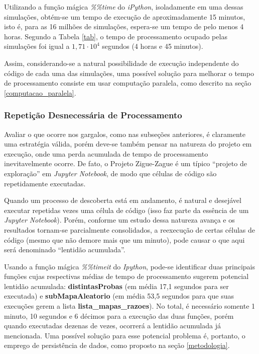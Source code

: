 \documentclass[12pt]{article}
\newcommand{\aspas}[1]{``#1''} %
\begin{document}
Utilizando a função mágica \textit{\%\%time} do \textit{iPython}, isoladamente em uma dessas simulações, obtém-se um tempo de execução de aproximadamente 15 minutos, isto é, para as 16 milhões de simulações, espera-se um tempo de pelo menos 4 horas. Segundo a Tabela \ref{tab}, o tempo de processamento ocupado pelas simulações foi igual a $1,71 \cdot 10^4$ segundos (4 horas e 45 minutos). 

Assim, considerando-se a natural possibilidade de execução independente do código de cada uma das simulações, uma possível solução para melhorar o tempo de processamento consiste em usar computação paralela, como descrito na seção \ref{computacao_paralela}.

\subsubsection{Repetição Desnecessária de Processamento}
\label{repeticao}


Avaliar o que ocorre nos gargalos, como nas subseções anteriores, é claramente uma estratégia válida, porém deve-se também pensar na natureza do projeto em execução, onde uma perda acumulada de tempo de processamento inevitavelmente ocorre. De fato, o Projeto Zigue-Zague é um típico \aspas{projeto de exploração} em \textit{Jupyter Notebook}, de modo que células de código são repetidamente executadas.

Quando um processo de descoberta está em andamento, é natural e desejável executar repetidas vezes uma célula de código (isso faz parte da essência de um \textit{Jupyter Notebook}). Porém, conforme um estudo dessa natureza avança e os resultados tornam-se parcialmente consolidados, a reexecução de certas células de código (mesmo que não demore mais que um minuto), pode causar o que aqui será denominado \aspas{lentidão acumulada}.

Usando a função mágica \textit{\%\%timeit} do \textit{Ipython}, pode-se identificar duas principais funções cujas respectivas médias de tempo de processamento sugerem potencial lentidão acumulada: \textbf{distintasProbas} (em média 17,1 segundos para ser executada) e \textbf{subMapaAleatorio} (em média 53,5 segundos para que suas execuções gerem a lista \textbf{lista\_mapas\_razoes}). No total, é necessário somente 1 minuto, 10 segundos e 6 décimos para a execução das duas funções, porém quando executadas dezenas de vezes, ocorrerá a lentidão acumulada já mencionada. Uma possível solução para esse potencial problema é, portanto, o emprego de persistência de dados, como proposto na seção \ref{metodologia}.
\end{document}
